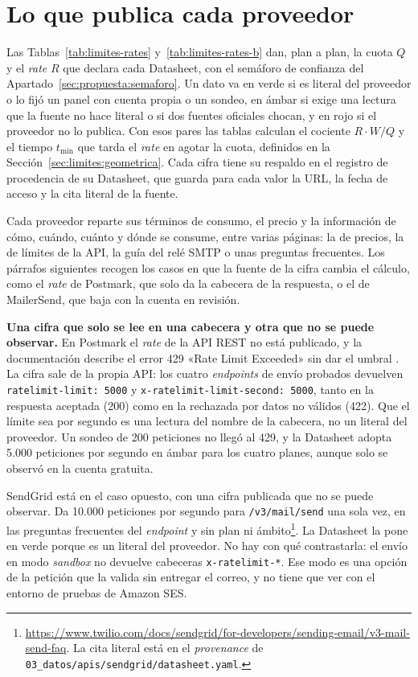 \section{Lo que publica cada proveedor}\label{sec:limites:publicado}

Las Tablas~\ref{tab:limites-rates} y~\ref{tab:limites-rates-b} dan, plan a plan, la cuota $Q$ y el \textit{rate} $R$ que declara cada Datasheet, con el semáforo de confianza del Apartado~\ref{sec:propuesta:semaforo}.
Un dato va en verde si es literal del proveedor o lo fijó un panel con cuenta propia o un sondeo, en ámbar si exige una lectura que la fuente no hace literal o si dos fuentes oficiales chocan, y en rojo si el proveedor no lo publica.
Con esos pares las tablas calculan el cociente $R \cdot W / Q$ y el tiempo $t_{\min}$ que tarda el \textit{rate} en agotar la cuota, definidos en la Sección~\ref{sec:limites:geometrica}.
Cada cifra tiene su respaldo en el registro de procedencia de su Datasheet, que guarda para cada valor la URL, la fecha de acceso y la cita literal de la fuente.

Cada proveedor reparte sus términos de consumo, el precio y la información de cómo, cuándo, cuánto y dónde se consume, entre varias páginas: la de precios, la de límites de la API, la guía del relé SMTP o unas preguntas frecuentes.
Los párrafos siguientes recogen los casos en que la fuente de la cifra cambia el cálculo, como el \textit{rate} de Postmark, que solo da la cabecera de la respuesta, o el de MailerSend, que baja con la cuenta en revisión.

\textbf{Una cifra que solo se lee en una cabecera y otra que no se puede observar.}
En Postmark el \textit{rate} de la API REST no está publicado, y la documentación describe el error 429 «Rate Limit Exceeded» sin dar el umbral \citep{postmarkapi}.
La cifra sale de la propia API: los cuatro \textit{endpoints} de envío probados devuelven \texttt{ratelimit-\allowbreak limit:~5000} y \texttt{x-ratelimit-\allowbreak limit-second:~5000}, tanto en la respuesta aceptada (200) como en la rechazada por datos no válidos (422).
Que el límite sea por segundo es una lectura del nombre de la cabecera, no un literal del proveedor.
Un sondeo de 200 peticiones no llegó al 429, y la Datasheet adopta 5.000 peticiones por segundo en ámbar para los cuatro planes, aunque solo se observó en la cuenta gratuita.

SendGrid está en el caso opuesto, con una cifra publicada que no se puede observar.
Da 10.000 peticiones por segundo para \texttt{/v3/mail/send} una sola vez, en las preguntas frecuentes del \textit{endpoint} y sin plan ni ámbito\footnote{\url{https://www.twilio.com/docs/sendgrid/for-developers/sending-email/v3-mail-send-faq}. La cita literal está en el \textit{provenance} de \texttt{03\_datos/apis/sendgrid/datasheet.yaml}.}.
La Datasheet la pone en verde porque es un literal del proveedor.
No hay con qué contrastarla: el envío en modo \textit{sandbox} no devuelve cabeceras \texttt{x-ratelimit-*}.
Ese modo es una opción de la petición que la valida sin entregar el correo, y no tiene que ver con el entorno de pruebas de Amazon SES.

